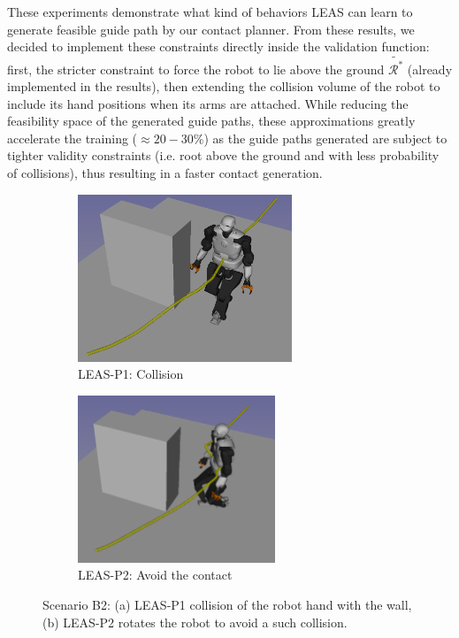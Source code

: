 These experiments demonstrate what kind of behaviors LEAS can learn to generate feasible guide path by our contact planner. 
From these results, we decided to implement these constraints directly inside the validation function: first, the stricter constraint to force the robot to lie above the ground $\tilde{\mathcal{R}^*}$ (already implemented in the results), then extending the collision volume of the robot to include its hand positions when its arms are attached.
While reducing the feasibility space of the generated guide paths, these approximations greatly accelerate the training ($\approx 20-30$\%) as the guide paths generated are subject to tighter validity constraints (i.e. root above the ground and with less probability of collisions), thus resulting in a faster contact generation.


\begin{figure}[h]
    \captionsetup[subfigure]{justification=centering}
    \centering
    \begin{subfigure}[t]{0.48\linewidth}
        \includegraphics[width=\textwidth, height=5cm]{Figures/Chapter_CPSB/avoid_wall_fail.png}
        \caption{LEAS-P1: Collision\label{fig:cp-sb:talos_wall_collision}}
        \label{fig:cp-sb:talos_wall:p1}
    \end{subfigure}
    \begin{subfigure}[t]{0.48\linewidth}
        \includegraphics[width=\textwidth, height=5cm]{Figures/Chapter_CPSB/avoid_wall.png}
        \caption{LEAS-P2: Avoid the contact\label{fig:cp-sb:talos_wall_ok}}
        \label{fig:cp-sb:talos_wall:p2}
    \end{subfigure}
    \caption{Scenario B2: (a) LEAS-P1 collision of the robot hand with the wall, (b) LEAS-P2 rotates the robot to avoid a such collision.}
    \label{fig:cp-sb:talos_wall}
\end{figure}


